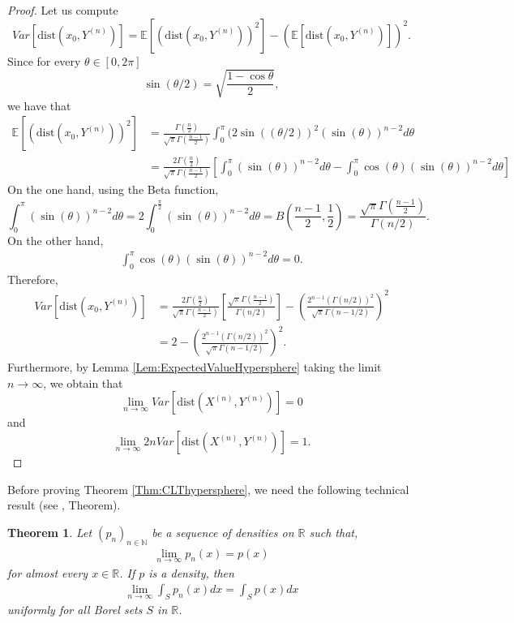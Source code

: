 \documentclass[10pt]{amsart}
\newtheorem{theorem}{Theorem}[section]
\newcounter{theor}
\def\R{\mathbb{R}}
\def\N{\mathbb{N}}
\def\dist{\text{dist}}
\numberwithin{equation}{section}
\begin{document}
\begin{proof}
Let us compute
$$
Var [\dist(x_0 , Y^{(n)}) ] = 
\mathbb{E}[(\dist(x_0 , Y^{(n)}))^2] - \left( \mathbb{E}[\dist(x_0 , Y^{(n)})] \right)^2.
$$
Since for every $\theta \in [ 0, 2\pi ]$ $$
\sin (\theta / 2 ) = \sqrt{\frac{1-\cos \theta}{2}},
$$
we have that
\begin{align*}
\mathbb{E} \left[ \left( \dist(x_0 , Y^{(n)})\right)^2 \right] & = \frac{\Gamma ( \frac{n}{2} ) }{ \sqrt{\pi} \Gamma ( \frac{n-1}{2} )} \int_0^{\pi} (2\sin((\theta/2))^2 (\sin (\theta))^{n-2} d\theta 
 \\
 & = \frac{2 \Gamma (  \frac{n}{2} ) }{ \sqrt{\pi} \Gamma ( \frac{n-1}{2} )} \left[ \int_0^{\pi} (\sin (\theta))^{n-2}  d\theta
 - \int_0^{\pi} \cos (\theta) (\sin (\theta))^{n-2} d\theta  \right]
\end{align*}
On the one hand, using the Beta function,
$$
\int_0^{\pi} (\sin (\theta))^{n-2}  d\theta =
2 \int_0^{\frac{\pi}{2}} (\sin (\theta))^{n-2}  d\theta 
  =  B \left( \frac{n-1}{2} , \frac{1}{2}  \right) = \frac{\sqrt{\pi} \Gamma \left( \frac{n-1}{2} \right)}{ \Gamma(n/2) }.
$$
On the other hand,
\begin{align*}
\int_0^{\pi} \cos (\theta) (\sin (\theta))^{n-2} d\theta  = 0.
\end{align*}
Therefore,
\begin{align*}
Var [\dist(x_0 , Y^{(n)}) ] & = \frac{2 \Gamma ( \frac{n}{2} ) }{ \sqrt{\pi} \Gamma ( \frac{n-1}{2} )} \left[ \frac{\sqrt{\pi} \Gamma ( \frac{n-1}{2} )}{ \Gamma(n/2) } \right] - \left( \frac{2^{n-1} \left( \Gamma(n/2) \right)^2}{\sqrt{\pi}\Gamma(n-1/2)} \right)^2
 \\
 & = 2 - \left( \frac{2^{n-1} \left( \Gamma(n/2) \right)^2}{\sqrt{\pi}\Gamma(n-1/2)} \right)^{2}.
\end{align*}
Furthermore, by Lemma \ref{Lem:ExpectedValueHypersphere} taking the limit $n \to \infty$, we obtain that
$$ \lim _{n \to \infty} Var [\dist(X^{(n)} , Y^{(n)})] = 0  $$
and
$$ \lim _{n \to \infty} 2n  Var [\dist(X^{(n)} , Y^{(n)})]= 1 .  $$
\end{proof}

Before proving Theorem \ref{Thm:CLThypersphere}, we need the following technical result (see \cite{S}, Theorem).

\begin{theorem}
\label{UniformIntegrabTheorem}
Let $( p_n )_{n \in \N}$ be a sequence of densities on $\R$ such that, 
\begin{align*}
\lim _{n \to \infty} p_n (x) = p (x)
\end{align*}
for almost every $x \in \R$. If $p$ is a density, then
\begin{align*}
\lim _{n \to \infty} 	\int_ S p_n(x) dx = 	\int_ S p(x) dx 
\end{align*}
uniformly for all Borel sets $S$ in $\R$.
\end{theorem}
\end{document}
